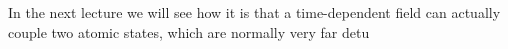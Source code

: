 In the next lecture we will see how it is that a time-dependent field can actually couple two atomic states, which are normally very far detu